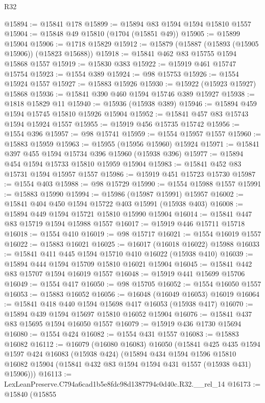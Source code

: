 \begin{lexlean}{R32}
\begin{coremodule}
@15894 := @15841 @178
@15899 := @15894 @83 @1594 @1594 @15810 @1557
@15904 := @15848 @49 @15810 (@1704 (@15851 @49))
@15905 := @15899 @15904
@15906 := @1718 @15829
@15912 := @15879 (@15887 (@15893 (@15905 @15906)) (@15823 @15688))
@15918 := @15841 @462 @83 @15755 @1594 @15868 @1557
@15919 := @15830 @383
@15922 := @15919 @461 @15747 @15754
@15923 := @1554 @389
@15924 := @98 @15753
@15926 := @1554 @15924 @1557
@15927 := @15883 @15926
@15930 := @15922 (@15923 @15927) @15868
@15936 := @15841 @390 @460 @1594 @15746 @389 @15927
@15938 := @1818 @15829 @11
@15940 := @15936 (@15938 @389)
@15946 := @15894 @459 @1594 @15745 @15810 @15926 @15904
@15952 := @15841 @457 @83 @15743 @1594 @15924 @1557
@15955 := @15919 @456 @15735 @15742
@15956 := @1554 @396
@15957 := @98 @15741
@15959 := @1554 @15957 @1557
@15960 := @15883 @15959
@15963 := @15955 (@15956 @15960) @15924
@15971 := @15841 @397 @455 @1594 @15734 @396 @15960 (@15938 @396)
@15977 := @15894 @454 @1594 @15733 @15810 @15959 @15904
@15983 := @15841 @452 @83 @15731 @1594 @15957 @1557
@15986 := @15919 @451 @15723 @15730
@15987 := @1554 @403
@15988 := @98 @15729
@15990 := @1554 @15988 @1557
@15991 := @15883 @15990
@15994 := @15986 (@15987 @15991) @15957
@16002 := @15841 @404 @450 @1594 @15722 @403 @15991 (@15938 @403)
@16008 := @15894 @449 @1594 @15721 @15810 @15990 @15904
@16014 := @15841 @447 @83 @15719 @1594 @15988 @1557
@16017 := @15919 @446 @15711 @15718
@16018 := @1554 @410
@16019 := @98 @15717
@16021 := @1554 @16019 @1557
@16022 := @15883 @16021
@16025 := @16017 (@16018 @16022) @15988
@16033 := @15841 @411 @445 @1594 @15710 @410 @16022 (@15938 @410)
@16039 := @15894 @444 @1594 @15709 @15810 @16021 @15904
@16045 := @15841 @442 @83 @15707 @1594 @16019 @1557
@16048 := @15919 @441 @15699 @15706
@16049 := @1554 @417
@16050 := @98 @15705
@16052 := @1554 @16050 @1557
@16053 := @15883 @16052
@16056 := @16048 (@16049 @16053) @16019
@16064 := @15841 @418 @440 @1594 @15698 @417 @16053 (@15938 @417)
@16070 := @15894 @439 @1594 @15697 @15810 @16052 @15904
@16076 := @15841 @437 @83 @15695 @1594 @16050 @1557
@16079 := @15919 @436 @1730 @15694
@16080 := @1554 @424
@16082 := @1554 @431 @1557
@16083 := @15883 @16082
@16112 := @16079
    (@16080 @16083)
    @16050
    (@15841
      @425
      @435
      @1594
      @1597
      @424
      @16083
      (@15938 @424)
      (@15894
        @434
        @1594
        @1596
        @15810
        @16082
        @15904
        (@15841 @432 @83 @1594 @1594 @431 @1557 (@15938 @431) @15906)))
@16113 := LexLeanPreserve.C794a6cad1b5e8fdc98d1387794c0d40c.R32.__rel_14
@16173 := @15840
    (@15855

\end{coremodule}
\end{lexlean}
